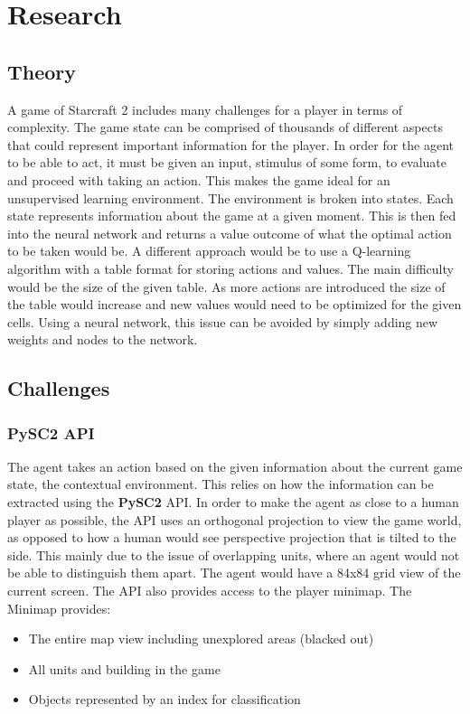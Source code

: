 \chapter{Research}%
\label{research}

\section{Theory}
A game of Starcraft 2 includes many challenges for a player in terms of complexity. The game state can be comprised of thousands of different aspects that could represent important information for the player. In order for the agent to be able to act, it must be given an input, stimulus of some form, to evaluate and proceed with taking an action. This makes the game ideal for an unsupervised learning environment.
The environment is broken into states. Each state represents information about the game at a given moment. This is then fed into the neural network and returns a value outcome of what the optimal action to be taken would be.
A different approach would be to use a Q-learning algorithm with a table format for storing actions and values. The main difficulty would be the size of the given table. As more actions are introduced the size of the table would increase and new values would need to be optimized for the given cells. Using a neural network, this issue can be avoided by simply adding new weights and nodes to the network.

\section{Challenges}


\subsection{PySC2 API}
The agent takes an action based on the given information about the current game state, the contextual environment. This relies on how the information can be extracted using the \textbf{PySC2} API.
In order to make the agent as close to a human player as possible, the API uses an orthogonal projection to view the game world, as opposed to how a human would see perspective projection that is tilted to the side. This mainly due to the issue of overlapping units, where an agent would not be able to distinguish them apart. The agent would have a 84x84 grid view of the current screen. The API also provides access to the player minimap. The Minimap provides:
\begin{itemize}
\item The entire map view including unexplored areas (blacked out)
\item All units and building in the game
\item Objects represented by an index for classification
\end{itemize}

